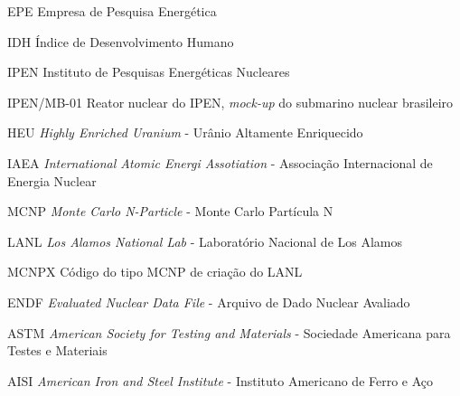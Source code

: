 \documentclass[
	12pt,				%
	openany,			%
	twoside,			%
	a4paper,			%
	english,			%
	french,				%
	spanish,			%
	brazil				%
	]{abntex2}
\begin{document}
\begin{siglas}
  \item[EPE] Empresa de Pesquisa Energética
  \item[IDH] Índice de Desenvolvimento Humano
  \item[IPEN] Instituto de Pesquisas Energéticas Nucleares 
  \item[IPEN/MB-01] Reator nuclear do IPEN, \emph{mock-up} do submarino nuclear brasileiro
  \item[HEU] \emph{Highly Enriched Uranium} - Urânio Altamente Enriquecido
  \item[IAEA] \emph{International Atomic Energi Assotiation} - Associação Internacional de Energia Nuclear
  \item[MCNP] \emph{Monte Carlo N-Particle} -  Monte Carlo Partícula N
  \item[LANL] \emph{Los Alamos National Lab} - Laboratório Nacional de Los Alamos 
  \item[MCNPX] Código do tipo MCNP de criação do LANL  
  \item[ENDF] \emph{Evaluated Nuclear Data File} - Arquivo de Dado Nuclear Avaliado 
  \item[ASTM] \emph{American Society for Testing and Materials} - Sociedade Americana para Testes e Materiais
  \item[AISI] \emph{American Iron and Steel Institute} - Instituto Americano de Ferro e Aço
\end{siglas}


\tableofcontents*
\cleardoublepage



\textual

\end{document}
